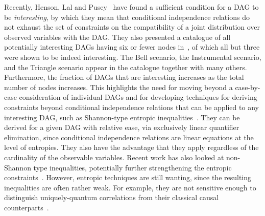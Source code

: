 Recently, Henson, Lal and Pusey~\cite{pusey2014gdag} have found a sufficient condition for a DAG to be {\em interesting}, by which they mean that conditional independence relations do not exhaust the set  of constraints on the compatibility of a joint distribution over observed variables with the DAG. They also presented a catalogue of all potentially interesting DAGs having six or fewer nodes in~\cite[App.~E]{pusey2014gdag}, of which all but three were shown to be indeed interesting. The Bell scenario, the Instrumental scenario, and the Triangle scenario appear in the catalogue together with many others.   Furthermore, the fraction of DAGs that are interesting increases as the total number of nodes increases.  This highlights the need for moving beyond a case-by-case consideration of individual DAGs and for developing techniques for deriving constraints beyond conditional independence relations that can be applied to any interesting DAG, such as Shannon-type entropic inequalities~\cite{steudel2010ancestors,fritz2012bell,fritz2013marginal,chaves2014novel,chaves2014informationinference}. They can be derived for a given DAG with relative ease, via exclusively linear quantifier elimination, since conditional independence relations are linear equations at the level of entropies. They also have the advantage that they apply regardless of the cardinality of the observable variables. Recent work has also looked at non-Shannon type inequalities, potentially further strengthening the entropic constraints~\cite{weilenmann2016entropic,pianaar2016interesting}. However, entropic techniques are still wanting, since the resulting inequalities are often rather weak. For example, they are not sensitive enough to distinguish uniquely-quantum correlations from their classical causal counterparts~\cite{fritz2012bell,weilenmann2016entropic}.


